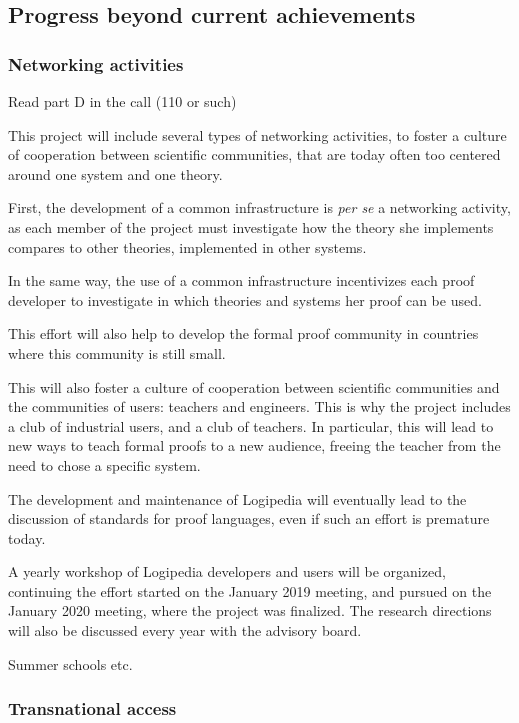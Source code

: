 \subsection{Progress beyond current achievements}

\subsubsection{Networking activities}

{\color{red} Read part D in the call (110 or such)}

This project will include several types of networking activities, to
foster a culture of cooperation between scientific communities, that
are today often too centered around one system and one theory.

First, the development of a common infrastructure is \emph{per se} a
networking activity, as each member of the project must investigate
how the theory she implements compares to other theories, implemented
in other systems.

In the same way, the use of a common infrastructure incentivizes each
proof developer to investigate in which theories and systems her proof
can be used.

This effort will also help to develop the formal proof community in
countries where this community is still small.

This will also foster a culture of cooperation between scientific
communities and the communities of users: teachers and engineers.
This is why the project includes a club of industrial users, and
a club of teachers. In particular, this will lead to new ways to teach
formal proofs to a new audience, freeing the teacher from the need to
chose a specific system.

The development and maintenance of {\sf Logipedia} will eventually lead
to the discussion of standards for proof languages, even if such an
effort is premature today.

A yearly workshop of {\sf Logipedia} developers and users will be
organized, continuing the effort started on the January 2019 meeting,
and pursued on the January 2020 meeting, where the project was
finalized. The research directions will also be discussed
every year with the advisory board.

{\color{red} Summer schools etc.}

\subsubsection{Transnational access}

